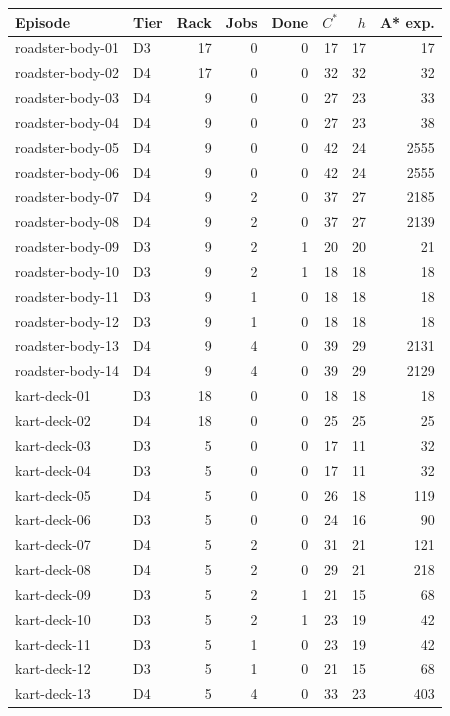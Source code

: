 \begin{longtable}{llrrrrrr}
\toprule Episode & Tier & Rack & Jobs & Done & $C^*$ & $h$ & A* exp.\\\midrule\endhead
roadster-body-01 & D3 & 17 & 0 & 0 & 17 & 17 & 17\\
roadster-body-02 & D4 & 17 & 0 & 0 & 32 & 32 & 32\\
roadster-body-03 & D4 & 9 & 0 & 0 & 27 & 23 & 33\\
roadster-body-04 & D4 & 9 & 0 & 0 & 27 & 23 & 38\\
roadster-body-05 & D4 & 9 & 0 & 0 & 42 & 24 & 2555\\
roadster-body-06 & D4 & 9 & 0 & 0 & 42 & 24 & 2555\\
roadster-body-07 & D4 & 9 & 2 & 0 & 37 & 27 & 2185\\
roadster-body-08 & D4 & 9 & 2 & 0 & 37 & 27 & 2139\\
roadster-body-09 & D3 & 9 & 2 & 1 & 20 & 20 & 21\\
roadster-body-10 & D3 & 9 & 2 & 1 & 18 & 18 & 18\\
roadster-body-11 & D3 & 9 & 1 & 0 & 18 & 18 & 18\\
roadster-body-12 & D3 & 9 & 1 & 0 & 18 & 18 & 18\\
roadster-body-13 & D4 & 9 & 4 & 0 & 39 & 29 & 2131\\
roadster-body-14 & D4 & 9 & 4 & 0 & 39 & 29 & 2129\\
kart-deck-01 & D3 & 18 & 0 & 0 & 18 & 18 & 18\\
kart-deck-02 & D4 & 18 & 0 & 0 & 25 & 25 & 25\\
kart-deck-03 & D3 & 5 & 0 & 0 & 17 & 11 & 32\\
kart-deck-04 & D3 & 5 & 0 & 0 & 17 & 11 & 32\\
kart-deck-05 & D4 & 5 & 0 & 0 & 26 & 18 & 119\\
kart-deck-06 & D3 & 5 & 0 & 0 & 24 & 16 & 90\\
kart-deck-07 & D4 & 5 & 2 & 0 & 31 & 21 & 121\\
kart-deck-08 & D4 & 5 & 2 & 0 & 29 & 21 & 218\\
kart-deck-09 & D3 & 5 & 2 & 1 & 21 & 15 & 68\\
kart-deck-10 & D3 & 5 & 2 & 1 & 23 & 19 & 42\\
kart-deck-11 & D3 & 5 & 1 & 0 & 23 & 19 & 42\\
kart-deck-12 & D3 & 5 & 1 & 0 & 21 & 15 & 68\\
kart-deck-13 & D4 & 5 & 4 & 0 & 33 & 23 & 403\\

\end{longtable}
